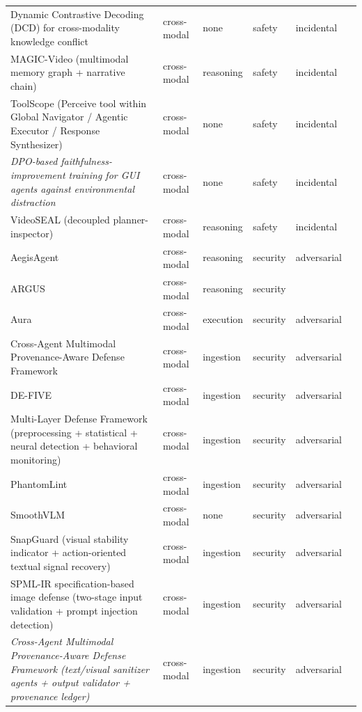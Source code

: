 \begin{longtable}{@{}p{}lllll@{}}
Dynamic Contrastive Decoding (DCD) for cross-modality knowledge conflict & cross-modal & none & safety & incidental & \cite{zhu-2024-unraveling} \\
MAGIC-Video (multimodal memory graph + narrative chain) & cross-modal & reasoning & safety & incidental & \cite{li-2026-bridging} \\
ToolScope (Perceive tool within Global Navigator / Agentic Executor / Response Synthesizer) & cross-modal & none & safety & incidental & \cite{deng-2025-toolscope} \\
\emph{DPO-based faithfulness-improvement training for GUI agents against environmental distraction} & cross-modal & none & safety & incidental & \cite{ma-2024-caution} \\
VideoSEAL (decoupled planner-inspector) & cross-modal & reasoning & safety & incidental & \cite{qiu-2026-videoseal} \\
AegisAgent & cross-modal & reasoning & security & adversarial & \cite{wang-2025-aegisagent} \\
ARGUS & cross-modal & reasoning & security &  & \cite{lu-2025-argus} \\
Aura & cross-modal & execution & security & adversarial & \cite{zou-2026-blind} \\
Cross-Agent Multimodal Provenance-Aware Defense Framework & cross-modal & ingestion & security & adversarial & \cite{syed-2025-trustworthy} \\
DE-FIVE & cross-modal & ingestion & security & adversarial & \cite{zhong-2026-defive} \\
Multi-Layer Defense Framework (preprocessing + statistical + neural detection + behavioral monitoring) & cross-modal & ingestion & security & adversarial & \cite{pathade-2025-invisible} \\
PhantomLint & cross-modal & ingestion & security & adversarial & \cite{murray-2025-phantomlint} \\
SmoothVLM & cross-modal & none & security & adversarial & \cite{sun-2024-safeguarding} \\
SnapGuard (visual stability indicator + action-oriented textual signal recovery) & cross-modal & ingestion & security & adversarial & \cite{du-2026-snapguard} \\
SPML-IR specification-based image defense (two-stage input validation + prompt injection detection) & cross-modal & ingestion & security & adversarial & \cite{sharma-2024-defending} \\
\emph{Cross-Agent Multimodal Provenance-Aware Defense Framework (text/visual sanitizer agents + output validator + provenance ledger)} & cross-modal & ingestion & security & adversarial & \cite{syed-2025-crossagent} \\

\end{longtable}
